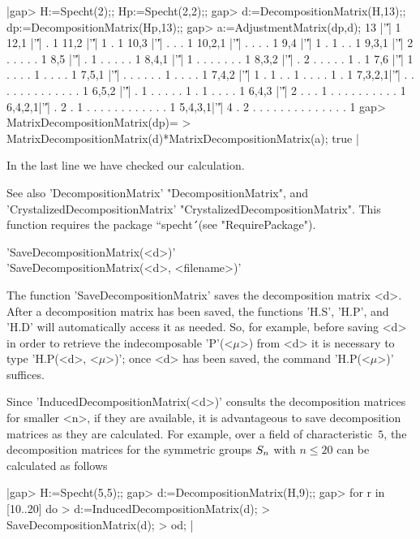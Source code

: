 |gap> H:=Specht(2);; Hp:=Specht(2,2);;
gap> d:=DecompositionMatrix(H,13);; dp:=DecompositionMatrix(Hp,13);;
gap> a:=AdjustmentMatrix(dp,d);
13     |'\|'| 1
12,1   |'\|'| . 1
11,2   |'\|'| 1 . 1
10,3   |'\|'| . . . 1
10,2,1 |'\|'| . . . . 1
9,4    |'\|'| 1 . 1 . . 1
9,3,1  |'\|'| 2 . . . . . 1
8,5    |'\|'| . 1 . . . . . 1
8,4,1  |'\|'| 1 . . . . . . . 1
8,3,2  |'\|'| . 2 . . . . . 1 . 1
7,6    |'\|'| 1 . . . . 1 . . . . 1
7,5,1  |'\|'| . . . . . . 1 . . . . 1
7,4,2  |'\|'| 1 . 1 . . 1 . . . . 1 . 1
7,3,2,1|'\|'| . . . . . . . . . . . . . 1
6,5,2  |'\|'| . 1 . . . . . 1 . 1 . . . . 1
6,4,3  |'\|'| 2 . . . 1 . . . . . . . . . . 1
6,4,2,1|'\|'| . 2 . 1 . . . . . . . . . . . . 1
5,4,3,1|'\|'| 4 . 2 . . . . . . . . . . . . . . 1 
gap> MatrixDecompositionMatrix(dp)=
>           MatrixDecompositionMatrix(d)*MatrixDecompositionMatrix(a);
true |

In the last line we have checked our calculation.

See also 'DecompositionMatrix' "DecompositionMatrix", and
'CrystalizedDecompositionMatrix' "CrystalizedDecompositionMatrix". This
function requires the package ``specht\'\'\ (see "RequirePackage").



'SaveDecompositionMatrix(<d>)' \\
'SaveDecompositionMatrix(<d>, <filename>)'

The function 'SaveDecompositionMatrix' saves the decomposition matrix <d>.
After a decomposition matrix has been saved, the functions 'H.S',
'H.P', and 'H.D' will automatically access it as needed. So, for example, 
before saving <d> in order to retrieve the indecomposable 'P'(<$\mu$>) 
from <d> it is necessary to type 'H.P(<d>, <$\mu$>)'; once <d> has been 
saved, the command 'H.P(<$\mu$>)' suffices. 

Since 'InducedDecompositionMatrix(<d>)' consults the decomposition 
matrices for smaller <n>, if they are available, it is advantageous to 
save decomposition matrices as they are calculated. For example, over a 
field of characteristic~$5$, the decomposition matrices for the symmetric 
groups $S_n$ with $n\le 20$ can be calculated as follows\:

|gap> H:=Specht(5,5);;
gap> d:=DecompositionMatrix(H,9);; 
gap> for r in [10..20] do
>      d:=InducedDecompositionMatrix(d); 
>      SaveDecompositionMatrix(d); 
>    od; |


